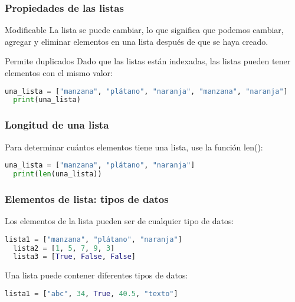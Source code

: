 \begin{frame}[fragile]
  \frametitle{Propiedades de las listas}

  \begin{block}{Modificable}
    La lista se puede cambiar, lo que significa que podemos cambiar,
    agregar y eliminar elementos en una lista después de que se haya creado.
  \end{block}

  \pausa
  \begin{block}{Permite duplicados}
    Dado que las listas están indexadas, las listas pueden tener
    elementos con el mismo valor: 
  \end{block}

  \vspace{\baselineskip}
  \begin{lstlisting}[language=Python]
  una_lista = ["manzana", "plátano", "naranja", "manzana", "naranja"]
  print(una_lista) 
  \end{lstlisting}
\end{frame}

\begin{frame}[fragile]
  \frametitle{Longitud de una lista}

  Para determinar cuántos elementos tiene una lista, use la función
  \textcolor{codeKeyword2}{len}():

  \vspace{\baselineskip}
  \begin{lstlisting}[language=Python]
  una_lista = ["manzana", "plátano", "naranja"]
  print(len(una_lista)) 
  \end{lstlisting}
\end{frame}

\begin{frame}[fragile]
  \frametitle{Elementos de lista: tipos de datos}

  Los elementos de la lista pueden ser de cualquier tipo de datos:

  \vspace{\baselineskip}
  \begin{lstlisting}[language=Python]
  lista1 = ["manzana", "plátano", "naranja"]
  lista2 = [1, 5, 7, 9, 3]
  lista3 = [True, False, False]
  \end{lstlisting}

  \pausa
  Una lista puede contener diferentes tipos de datos:
  \vspace{\baselineskip}
  \begin{lstlisting}[language=Python]
  lista1 = ["abc", 34, True, 40.5, "texto"]
  \end{lstlisting}
\end{frame}

